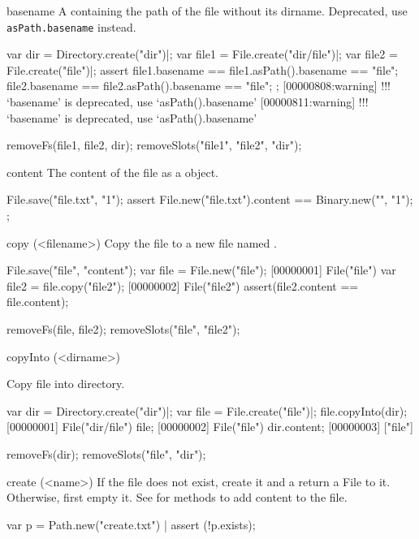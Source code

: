 \begin{urbiscriptapi}
\item[basename] A  containing the path of the file without
  its dirname.  Deprecated, use \lstinline|asPath.basename| instead.
\begin{urbiscript}
var dir = Directory.create("dir")|;
var file1 = File.create("dir/file")|;
var file2 = File.create("file")|;
assert
{
  file1.basename == file1.asPath().basename == "file";
  file2.basename == file2.asPath().basename == "file";
};
[00000808:warning] !!! `basename' is deprecated, use `asPath().basename'
[00000811:warning] !!! `basename' is deprecated, use `asPath().basename'
\end{urbiscript}
\begin{urbicomment}
removeFs(file1, file2, dir);
removeSlots("file1", "file2", "dir");
\end{urbicomment}


\item[content]
  The content of the file as a  object.
\begin{urbiscript}
File.save("file.txt", "1\n");
assert
{
  File.new("file.txt").content == Binary.new("", "1\n");
};
\end{urbiscript}


\item[copy](<filename>)
  Copy the file to a new file named .
\begin{urbiscript}
File.save("file", "content");
var file = File.new("file");
[00000001] File("file")
var file2 = file.copy("file2");
[00000002] File("file2")
assert(file2.content == file.content);
\end{urbiscript}
\begin{urbicomment}
removeFs(file, file2);
removeSlots("file", "file2");
\end{urbicomment}


\item[copyInto](<dirname>)
  \experimental{}

  Copy file into  directory.
\begin{urbiscript}
var dir = Directory.create("dir")|;
var file = File.create("file")|;
file.copyInto(dir);
[00000001] File("dir/file")
file;
[00000002] File("file")
dir.content;
[00000003] ["file"]
\end{urbiscript}
\begin{urbicomment}
removeFs(dir);
removeSlots("file", "dir");
\end{urbicomment}


\item[create](<name>)%
  If the file  does not exist, create it and a return a File to
  it.  Otherwise, first empty it.  See  for methods
  to add content to the file.
\begin{urbiscript}
var p = Path.new("create.txt") |
assert (!p.exists);


\end{urbiscript}
\end{urbiscriptapi}
